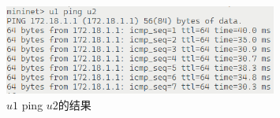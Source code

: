 \begin{figure}[h]
	\centering
	\includegraphics[width=0.8\textwidth]{image/u1pingu2.png}
	\caption{$u1$ ping $u2$的结果}
 	\label{fig:topo3}
\end{figure}